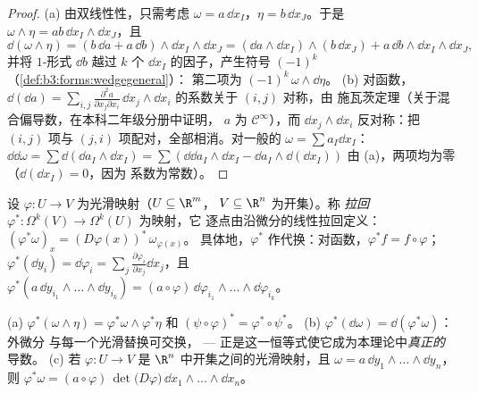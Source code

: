 \begin{proof}
(a) 由双线性性，只需考虑 $\omega = a\,\dd
x_I$，$\eta = b\,\dd x_J$。于是 $\omega \wedge \eta =
ab\,\dd x_I \wedge \dd x_J$，且
\[
\dd(\omega\wedge\eta) = (b\,\dd a + a\,\dd b) \wedge \dd x_I
\wedge \dd x_J
= (\dd a \wedge \dd x_I) \wedge (b\,\dd x_J) +
a\,\dd b \wedge \dd x_I \wedge \dd x_J,
\]
并将 $1$-形式 $\dd b$ 越过 $k$ 个 $\dd
x_I$ 的因子，产生符号 $(-1)^k$（\cref{def:b3:forms:wedgegeneral}）：
第二项为 $(-1)^k\,\omega \wedge \dd\eta$。
(b) 对函数，$\dd(\dd a) = \sum_{i,j}
\frac{\partial^2a}{\partial x_j\partial x_i}\,\dd x_j \wedge
\dd x_i$ 的系数关于 $(i,j)$ 对称，由
施瓦茨定理（关于混合偏导数，在本科二年级分册中证明，
$a$ 为 $\mathcal C^\infty$），而 $\dd x_j \wedge
\dd x_i$ 反对称：把 $(i,j)$ 项与
$(j,i)$ 项配对，全部相消。对一般的 $\omega = \sum
a_I\dd x_I$：$\dd\dd\omega = \sum\dd(\dd a_I \wedge \dd x_I)
= \sum(\dd\dd a_I\wedge\dd x_I - \dd a_I\wedge\dd(\dd x_I))$
由 (a)，两项均为零（$\dd(\dd x_I) = 0$，因为
系数为常数）。
\end{proof}

\begin{definition}[拉回]\label{def:b3:forms:pullback}
设 $\varphi\colon U \to V$ 为光滑映射（$U \subseteq \R^m$，
$V \subseteq \R^n$ 为开集）。称 \emph{拉回}
$\varphi^*\colon \Omega^k(V) \to \Omega^k(U)$ 为映射，它
逐点由沿微分的线性拉回定义：
$(\varphi^*\omega)_x = (D\varphi(x))^*\,\omega_{\varphi(x)}$。
具体地，$\varphi^*$ 作代换：对函数，$\varphi^*f = f \circ
\varphi$；$\varphi^*(\dd y_i) =
\dd\varphi_i = \sum_j\frac{\partial\varphi_i}{\partial
x_j}\dd x_j$，且 $\varphi^*(a\,\dd y_{i_1}\wedge\dots\wedge
\dd y_{i_k}) =
(a\circ\varphi)\,\dd\varphi_{i_1}\wedge\dots\wedge
\dd\varphi_{i_k}$。
\end{definition}

\begin{theorem}\label{thm:b3:forms:pullback}
(a) $\varphi^*(\omega \wedge \eta) = \varphi^*\omega \wedge
\varphi^*\eta$ 和 $(\psi \circ \varphi)^* = \varphi^* \circ
\psi^*$。
(b) $\varphi^*(\dd\omega) = \dd(\varphi^*\omega)$：外微分
与每一个光滑替换可交换，
--- 正是这一恒等式使它成为本理论中\emph{真正的}
导数。
(c) 若 $\varphi\colon U \to V$ 是
$\R^n$ 中开集之间的光滑映射，且 $\omega = a\,\dd y_1 \wedge \dots \wedge \dd
y_n$，则 $\varphi^*\omega = (a \circ
\varphi)\,\det\bigl(D\varphi\bigr)\,\dd x_1 \wedge \dots
\wedge \dd x_n$。
\end{theorem}

